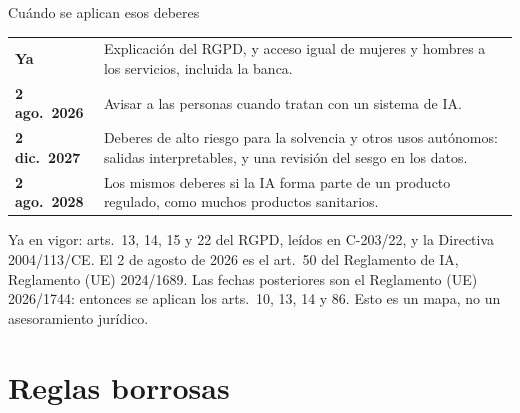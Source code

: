 \documentclass[aspectratio=169,11pt]{beamer}
\begin{document}
\begin{frame}{Cuándo se aplican esos deberes}
  \small
  \renewcommand{\arraystretch}{1.28}
  \begin{tabular}{@{}l p{}@{}}
    \textcolor{ebdnavy}{\textbf{Ya}} &
      Explicación del RGPD, y acceso igual de mujeres y hombres a los servicios, incluida la banca. \\
    \textcolor{ebdnavy}{\textbf{2 ago.\ 2026}} &
      Avisar a las personas cuando tratan con un sistema de IA. \\
    \textcolor{ebdnavy}{\textbf{2 dic.\ 2027}} &
      Deberes de alto riesgo para la solvencia y otros usos autónomos: salidas interpretables, y una revisión del sesgo en los datos. \\
    \textcolor{ebdnavy}{\textbf{2 ago.\ 2028}} &
      Los mismos deberes si la IA forma parte de un producto regulado, como muchos productos sanitarios. \\
  \end{tabular}

  \vspace{0.35em}
  {\scriptsize\color{ebdmuted}Ya en vigor: arts.\ 13, 14, 15 y 22 del RGPD, leídos en C-203/22, y la Directiva 2004/113/CE.
  El 2 de agosto de 2026 es el art.\ 50 del Reglamento de IA, Reglamento (UE) 2024/1689.
  Las fechas posteriores son el Reglamento (UE) 2026/1744: entonces se aplican los arts.\ 10, 13, 14 y 86. Esto es un mapa, no un asesoramiento jurídico.}
\end{frame}

\section{Reglas borrosas}
\end{document}
